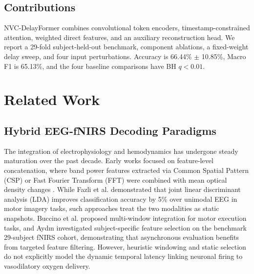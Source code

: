\documentclass[final,5p,times,twocolumn]{elsarticle}
\begin{document}
\subsection{Contributions}
NVC-DelayFormer combines convolutional token encoders, timestamp-constrained attention, weighted direct features, and an auxiliary reconstruction head. We report a 29-fold subject-held-out benchmark, component ablations, a fixed-weight delay sweep, and four input perturbations. Accuracy is 66.44\% $\pm$ 10.85\%, Macro F1 is 65.13\%, and the four baseline comparisons have BH $q<0.01$.

\section{Related Work}
\label{sec:related}

\subsection{Hybrid EEG-fNIRS Decoding Paradigms}
The integration of electrophysiology and hemodynamics has undergone steady maturation over the past decade. Early works focused on feature-level concatenation, where band power features extracted via Common Spatial Pattern (CSP) or Fast Fourier Transform (FFT) were combined with mean optical density changes \cite{fazli2012enhanced}. While Fazli et al. demonstrated that joint linear discriminant analysis (LDA) improves classification accuracy by 5\% over unimodal EEG in motor imagery tasks, such approaches treat the two modalities as static snapshots. Buccino et al. \cite{buccino2016hybrid} proposed multi-window integration for motor execution tasks, and Ayd{\i}n \cite{aydin2020subject} investigated subject-specific feature selection on the benchmark 29-subject fNIRS cohort, demonstrating that asynchronous evaluation benefits from targeted feature filtering. However, heuristic windowing and static selection do not explicitly model the dynamic temporal latency linking neuronal firing to vasodilatory oxygen delivery.
\end{document}
